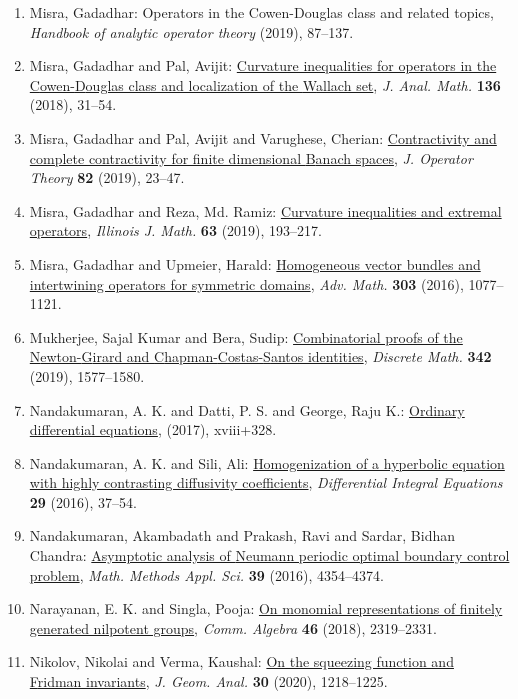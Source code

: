 \begin{enumerate}
\item Misra, Gadadhar: Operators in the {C}owen-{D}ouglas class and related topics, \emph{Handbook of analytic operator theory} {\bf } (2019), 87--137.
\item Misra, Gadadhar and Pal, Avijit: \href{https://doi.org/10.1007/s11854-018-0054-7}{Curvature inequalities for operators in the {C}owen-{D}ouglas
class and localization of the {W}allach set}, \emph{J. Anal. Math.} {\bf 136} (2018), 31--54.
\item Misra, Gadadhar and Pal, Avijit and Varughese, Cherian: \href{https://doi.org/10.7900/jot.2018jun13.2225}{Contractivity and complete contractivity for finite
dimensional {B}anach spaces}, \emph{J. Operator Theory} {\bf 82} (2019), 23--47.
\item Misra, Gadadhar and Reza, Md. Ramiz: \href{https://doi.org/10.1215/00192082-7768711}{Curvature inequalities and extremal operators}, \emph{Illinois J. Math.} {\bf 63} (2019), 193--217.
\item Misra, Gadadhar and Upmeier, Harald: \href{https://doi.org/10.1016/j.aim.2016.08.036}{Homogeneous vector bundles and intertwining operators for
symmetric domains}, \emph{Adv. Math.} {\bf 303} (2016), 1077--1121.
\item Mukherjee, Sajal Kumar and Bera, Sudip: \href{https://doi.org/10.1016/j.disc.2019.02.013}{Combinatorial proofs of the {N}ewton-{G}irard and
{C}hapman-{C}ostas-{S}antos identities}, \emph{Discrete Math.} {\bf 342} (2019), 1577--1580.
\item Nandakumaran, A. K. and Datti, P. S. and George, Raju K.: \href{https://doi.org/10.1017/9781108236843}{Ordinary differential equations}, \emph{} {\bf } (2017), xviii+328.
\item Nandakumaran, A. K. and Sili, Ali: \href{http://projecteuclid.org/euclid.die/1448323252}{Homogenization of a hyperbolic equation with highly
contrasting diffusivity coefficients}, \emph{Differential Integral Equations} {\bf 29} (2016), 37--54.
\item Nandakumaran, Akambadath and Prakash, Ravi and Sardar, Bidhan
Chandra: \href{https://doi.org/10.1002/mma.3865}{Asymptotic analysis of {N}eumann periodic optimal boundary
control problem}, \emph{Math. Methods Appl. Sci.} {\bf 39} (2016), 4354--4374.
\item Narayanan, E. K. and Singla, Pooja: \href{https://doi.org/10.1080/00927872.2017.1378894}{On monomial representations of finitely generated nilpotent
groups}, \emph{Comm. Algebra} {\bf 46} (2018), 2319--2331.
\item Nikolov, Nikolai and Verma, Kaushal: \href{https://doi.org/10.1007/s12220-019-00237-9}{On the squeezing function and {F}ridman invariants}, \emph{J. Geom. Anal.} {\bf 30} (2020), 1218--1225.

\end{enumerate}

